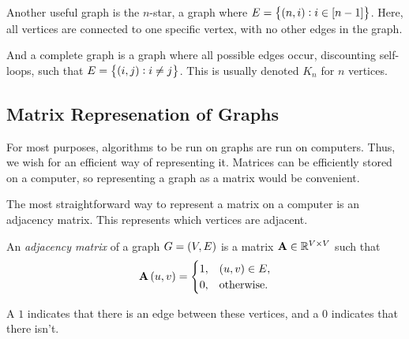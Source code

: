 \documentclass[11pt]{article}
\begin{document}
Another useful graph is the $n$-star,
a graph where $E=\set{\paren{n,i}:i\in\sqparen{n-1}}$.
Here, all vertices are connected to one specific vertex,
with no other edges in the graph.

\begin{center}
\end{center}

And a complete graph is a graph where all possible edges occur,
discounting self-loops, such that $E=\set{\paren{i,j}:i\neq j}$.
This is usually denoted $K_n$ for $n$ vertices.

\begin{center}
\end{center}

\subsection{Matrix Represenation of Graphs}
For most purposes, algorithms to be run on graphs are run on computers.
Thus, we wish for an efficient way of representing it.
Matrices can be efficiently stored on a computer,
so representing a graph as a matrix would be convenient.

The most straightforward way to represent a matrix on a computer is an adjacency matrix.
This represents which vertices are adjacent.
\begin{definition}
An \emph{adjacency matrix} of a graph $G=\paren{V,E}$
is a matrix $\V{A}\in\rea^{V\times V}$ such that
$$\V{A}\paren{u,v}=\begin{cases}1,&\paren{u,v}\in E,\\
0,&\text{otherwise}.\end{cases}$$

A $1$ indicates that there is an edge between these vertices,
and a $0$ indicates that there isn't.
\end{definition}
\end{document}
